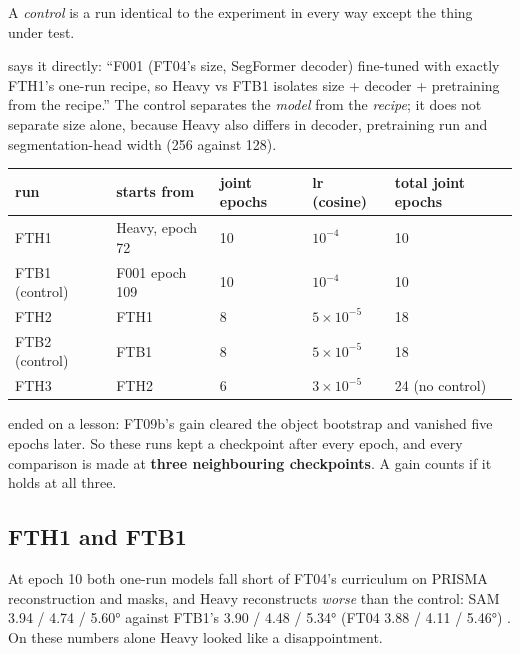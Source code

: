 \begin{definition}[Control]
A \emph{control} is a run identical to the experiment in every way except the thing
under test.
\end{definition}

 says it directly: ``F001 (FT04's size, SegFormer decoder) fine-tuned with exactly
FTH1's one-run recipe, so Heavy vs FTB1 isolates size + decoder + pretraining from the recipe.'' The control
separates the \emph{model} from the \emph{recipe}; it does not separate size alone, because Heavy also differs in
decoder, pretraining run and segmentation-head width (256 against 128).

\begin{center}\small
\begin{tabular}{lllll}
\toprule
run & starts from & joint epochs & lr (cosine) & total joint epochs\\
\midrule
FTH1 & Heavy, epoch 72 & 10 & $10^{-4}$ & 10\\
FTB1 (control) & F001 epoch 109 & 10 & $10^{-4}$ & 10\\
FTH2 & FTH1 & 8 & $5\times10^{-5}$ & 18\\
FTB2 (control) & FTB1 & 8 & $5\times10^{-5}$ & 18\\
FTH3 & FTH2 & 6 & $3\times10^{-5}$ & 24 (no control)\\
\bottomrule
\end{tabular}
\end{center}

 ended on a lesson: FT09b's gain cleared the object bootstrap and vanished five epochs later.
So these runs kept a checkpoint after every epoch, and every comparison is made at \textbf{three neighbouring
checkpoints}. A gain counts if it holds at all three.

\subsection{FTH1 and FTB1}

At epoch 10 both one-run models fall short of FT04's curriculum on PRISMA reconstruction and masks, and Heavy
reconstructs \emph{worse} than the control: SAM 3.94 / 4.74 / 5.60° against FTB1's 3.90 / 4.48 / 5.34° (FT04 3.88 /
4.11 / 5.46°) . On these numbers alone Heavy looked like a disappointment.

